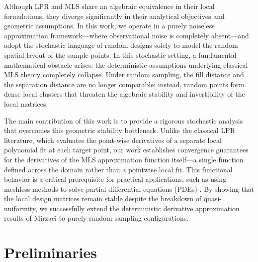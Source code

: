 \documentclass{article}
\begin{document}
Although LPR and MLS share an algebraic equivalence in their local formulations, they diverge significantly in their analytical objectives and geometric assumptions. In this work, we operate in a purely noiseless approximation framework—where observational noise is completely absent—and adopt the stochastic language of random designs solely to model the random spatial layout of the sample points. In this stochastic setting, a fundamental mathematical obstacle arises: the deterministic assumptions underlying classical MLS theory completely collapse. Under random sampling, the fill distance and the separation distance are no longer comparable; instead, random points form dense local clusters that threaten the algebraic stability and invertibility of the local matrices.

The main contribution of this work is to provide a rigorous stochastic analysis that overcomes this geometric stability bottleneck. Unlike the classical LPR literature, which evaluates the point-wise derivatives of a separate local polynomial fit at each target point, our work establishes convergence guarantees for the derivatives of the MLS approximation function itself—a single function defined across the domain rather than a pointwise local fit. This functional behavior is a critical prerequisite for practical applications, such as using meshless methods to solve partial differential equations (PDEs) \cite{mirzaei2015analysis}. By showing that the local design matrices remain stable despite the breakdown of quasi-uniformity, we successfully extend the deterministic derivative approximation results of Mirzaei \cite{mirzaei2015analysis} to purely random sampling configurations.

\section{Preliminaries}
\end{document}
